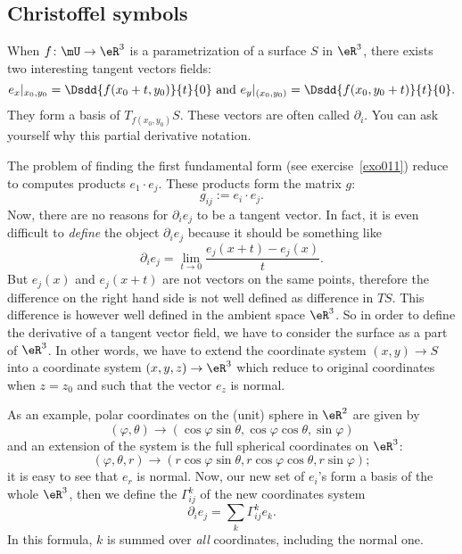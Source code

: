    \subsection{Christoffel symbols}
%

When $f\colon \mU\to \eR^3$ is a parametrization of a surface $S$ in $\eR^3$, there exists two interesting tangent vectors fields:
\begin{equation} \label{eq_basvecto}
 e_x|_{x_0,y_0}= \Dsdd{ f(x_0+t,y_0) }{t}{0}\text{ and } e_y|_{(x_0,y_0)}=\Dsdd{ f(x_0,y_0+t) }{t}{0}.
\end{equation}
They form a basis of $T_{f(x_0,y_0)}S$. These vectors are often called $\partial_i$. You can ask yourself why this partial derivative notation.

The problem of finding the first fundamental  form (see exercise~\ref{exo011}) reduce to computes products $e_1\cdot e_j$. These products form the matrix $g$:
\[
  g_{ij}:=e_i\cdot e_j.
\]
 Now, there are no reasons for $\partial_i e_j$ to be a tangent vector. In fact, it is even difficult to \emph{define} the object $\partial_i e_j$ because it should be something like
\[
  \partial_i e_j=\lim_{t\to 0}\frac{ e_j(x+t)-e_j(x) }{ t }.
\]
But $e_j(x)$ and $e_j(x+t)$ are not vectors on the same points, therefore the difference on the right hand side is not well defined as difference in $TS$. This difference is however well defined in the ambient space $\eR^3$. So in order to define the derivative of a tangent vector field, we have to consider the surface as a part of $\eR^3$. In other words, we have to extend the coordinate system $(x,y)\to S$ into a coordinate system $(x,y,z)\to\eR^3$ which reduce to original coordinates when $z=z_0$ and such that the vector $e_z$ is normal.

As an example, polar coordinates on the (unit) sphere in $\eR^2$ are given by
\[
  (\varphi,\theta)\to (\cos\varphi\sin\theta,\cos\varphi\cos\theta,\sin\varphi)
\]
and an extension of the system is the full spherical coordinates on $\eR^3$:
\[
   (\varphi,\theta,r)\to (r\cos\varphi\sin\theta,r\cos\varphi\cos\theta,r\sin\varphi);
\]
it is easy to see that $e_r$ is normal. Now, our new set of $e_i$'s form a basis of the whole $\eR^3$, then we define the  $\Gamma_{ij}^{k}$ of the new coordinates system
\begin{equation} \label{eq_def_sch}
\partial_ie_j=\sum_k\Gamma_{ij}^{k}e_k.
\end{equation}
In this formula, $k$ is summed over \emph{all} coordinates, including the normal one.

